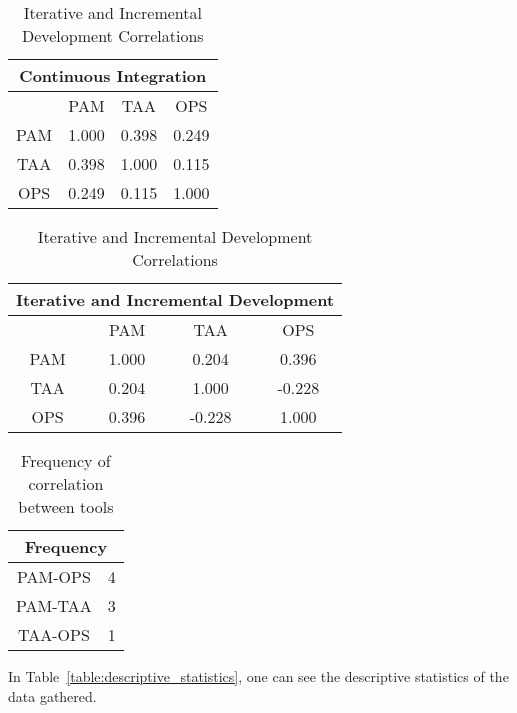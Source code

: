 \begin{table} [H]
 \RawFloats %
 \begin{minipage}{.45\textwidth}
  \caption{Continuous Integration Correlations}
  \label{table:ci_correlations}
  \begin{tabular}{| c | c | c | c | } \hline
  \multicolumn{4}{|c|}{\textbf{Continuous Integration}}  \\ \hline
   & \ac{PAM} & \ac{TAA} & \ac{OPS} \\ \hline
  \ac{PAM} & 1.000 & 0.398 & 0.249 \\ \hline
  \ac{TAA} & 0.398 & 1.000 & 0.115 \\ \hline
  \ac{OPS} & 0.249 & 0.115 & 1.000 \\ \hline
 \end{tabular}
 \end{minipage}%
%
 \begin{minipage}{.45\textwidth}
  \centering
   \caption{Iterative and Incremental Development Correlations}
  \label{table:iid_correlations}
  \begin{tabular}{| c | c | c | c |} \hline
  \multicolumn{4}{|c|}{\textbf{Iterative and Incremental Development}}  \\ \hline
  & \ac{PAM} & \ac{TAA} & \ac{OPS} \\ \hline
  \ac{PAM} & 1.000 & 0.204 & 0.396 \\ \hline
  \ac{TAA} & 0.204 & 1.000 & -0.228 \\ \hline
  \ac{OPS} & 0.396 & -0.228 & 1.000 \\ \hline
 \end{tabular}
 \end{minipage}%
\end{table}

\begin{table} [H]
	\caption{Frequency of correlation between tools}
	\label{table:correlations_frequency}
	\begin{tabular}{| c | c |} \hline
		\multicolumn{2}{|c|}{\textbf{Frequency}}  \\ \hline
		\ac{PAM}-\ac{OPS} & 4 \\ \hline
		\ac{PAM}-\ac{TAA} & 3 \\ \hline
		\ac{TAA}-\ac{OPS} & 1 \\ \hline
	\end{tabular}
\end{table}


In Table~\ref{table:descriptive_statistics}, one can see the descriptive statistics of the data gathered.

